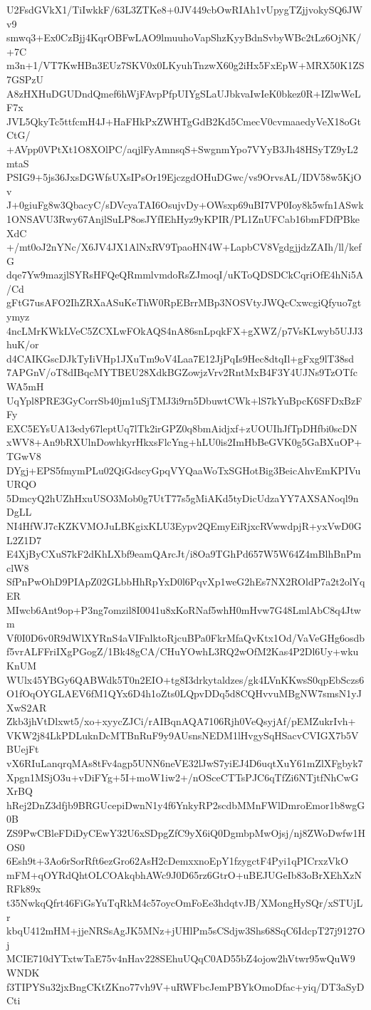 U2FsdGVkX1/TiIwkkF/63L3ZTKe8+0JV449cbOwRIAh1vUpygTZjjvokySQ6JWv9
smwq3+Ex0CzBjj4KqrOBFwLAO9lmuuhoVapShzKyyBdnSvbyWBc2tLz6OjNK/+7C
m3n+1/VT7KwHBn3EUz7SKV0x0LKyuhTnzwX60g2iHx5FxEpW+MRX50K1ZS7GSPzU
A8zHXHuDGUDndQmef6hWjFAvpPfpUIYgSLaUJbkvaIwIeK0bkez0R+IZlwWeLF7x
JVL5QkyTc5ttfcmH4J+HaFHkPxZWHTgGdB2Kd5CmecV0cvmaaedyVeX18oGtCtG/
+AVpp0VPtXt1O8XOlPC/aqjlFyAmnsqS+SwgnmYpo7VYyB3Jh48HSyTZ9yL2mtaS
PSIG9+5js36JxsDGWfsUXsIPsOr19EjczgdOHuDGwc/vs9OrvsAL/IDV58w5KjOv
J+0giuFg8w3QbacyC/sDVcyaTAI6OsujvDy+OWsxp69uBI7VP0Ioy8k5wfn1ASwk
1ONSAVU3Rwy67AnjlSuLP8osJYfIEhHyz9yKPIR/PL1ZnUFCab16bmFDfPBkeXdC
+/mt0oJ2nYNc/X6JV4JX1AlNxRV9TpaoHN4W+LapbCV8VgdgjjdzZAIh/ll/kefG
dqe7Yw9mazjlSYRsHFQeQRmmlvmdoRsZJmoqI/uKToQDSDCkCqriOfE4hNi5A/Cd
gFtG7usAFO2IhZRXaASuKeThW0RpEBrrMBp3NOSVtyJWQcCxwcgiQfyuo7gtymyz
4ncLMrKWkLVeC5ZCXLwFOkAQS4nA86snLpqkFX+gXWZ/p7VsKLwyb5UJJ3huK/or
d4CAIKGscDJkTyIiVHp1JXuTm9oV4Laa7E12JjPqIs9Hec8dtqIl+gFxg9lT38sd
7APGnV/oT8dIBqcMYTBEU28XdkBGZowjzVrv2RntMxB4F3Y4UJNs9TzOTfcWA5mH
UqYpl8PRE3GyCorrSb40jm1uSjTMJ3i9rn5DbuwtCWk+lS7kYuBpcK6SFDxBzFFy
EXC5EYsUA13edy67leptUq7lTk2irGPZ0q8bmAidjxf+zUOUIhJfTpDHfbi0scDN
xWV8+An9bRXUlnDowhkyrHkxsFlcYng+hLU0is2ImHbBeGVK0g5GaBXuOP+TGwV8
DYgj+EPS5fmymPLu02QiGdscyGpqVYQaaWoTxSGHotBig3BeicAhvEmKPIVuURQO
5DmcyQ2hUZhHxuUSO3Mob0g7UtT77s5gMiAKd5tyDicUdzaYY7AXSANoql9nDgLL
NI4HfWJ7cKZKVMOJuLBKgixKLU3Eypv2QEmyEiRjxcRVwwdpjR+yxVwD0GL2Z1D7
E4XjByCXuS7kF2dKhLXbf9eamQArcJt/i8Oa9TGhPd657W5W64Z4mBlhBnPmclW8
SfPnPwOhD9PIApZ02GLbbHhRpYxD0l6PqvXp1weG2hEs7NX2ROldP7a2t2olYqER
MIwcb6Ant9op+P3ng7omzil8I0041u8xKoRNaf5whH0mHvw7G48LmlAbC8q4Jtwm
Vf0I0D6v0R9dWlXYRnS4aVIFnlktoRjcuBPa0FkrMfaQvKtx1Od/VaVeGHg6osdb
f5vrALFFriIXgPGogZ/1Bk48gCA/CHuYOwhL3RQ2wOfM2Kas4P2Dl6Uy+wkuKnUM
WUlx45YBGy6QABWdk5T0n2EIO+tg8I3drkytaldzes/gk4LVnKKwsS0qpEbSczs6
O1fOqOYGLAEV6fM1QYx6D4h1oZts0LQpvDDq5d8CQHvvuMBgNW7smsN1yJXwS2AR
Zkb3jhVtDlxwt5/xo+xyycZJCi/rAIBqnAQA7106Rjh0VeQsyjAf/pEMZukrIvh+
VKW2j84LkPDLuknDcMTBnRuF9y9AUsnsNEDM1lHvgySqHSacvCVIGX7b5VBUejFt
vX6RIuLanqrqMAs8tFv4agp5UNN6neVE32lJwS7yiEJ4D6uqtXuY61mZlXFgbyk7
Xpgn1MSjO3u+vDiFYg+5I+moW1iw2+/nOSceCTTsPJC6qTfZi6NTjtfNhCwGXrBQ
hRej2DnZ3dfjb9BRGUcepiDwnN1y4f6YnkyRP2scdbMMnFWlDmroEmor1b8wgG0B
ZS9PwCBleFDiDyCEwY32U6xSDpgZfC9yX6iQ0DgmbpMwOjsj/nj8ZWoDwfw1HOS0
6Esh9t+3Ao6rSorRft6ezGro62AsH2cDemxxnoEpY1fzygctF4Pyi1qPICrxzVkO
mFM+qOYRdQhtOLCOAkqbhAWc9J0D65rz6GtrO+uBEJUGeIb83oBrXEhXzNRFk89x
t35NwkqQfrt46FiGsYuTqRkM4c57oycOmFoEe3hdqtvJB/XMongHySQr/xSTUjLr
kbqU412mHM+jjeNRSsAgJK5MNz+jUHlPm5sCSdjw3Shs68SqC6IdcpT27j9127Oj
MCIE710dYTxtwTaE75v4nHav228SEhuUQqC0AD55bZ4ojow2hVtwr95wQuW9WNDK
f3TIPYSu32jxBngCKtZKno77vh9V+uRWFbcJemPBYkOmoDfac+yiq/DT3aSyDCti
